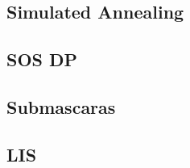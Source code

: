 \subsection{	Simulated Annealing}
\raggedbottom
\hrulefill
\subsection{	SOS DP}
\raggedbottom
\hrulefill
\subsection{	Submascaras}
\raggedbottom
\hrulefill
\subsection{LIS}
\raggedbottom
\hrulefill

